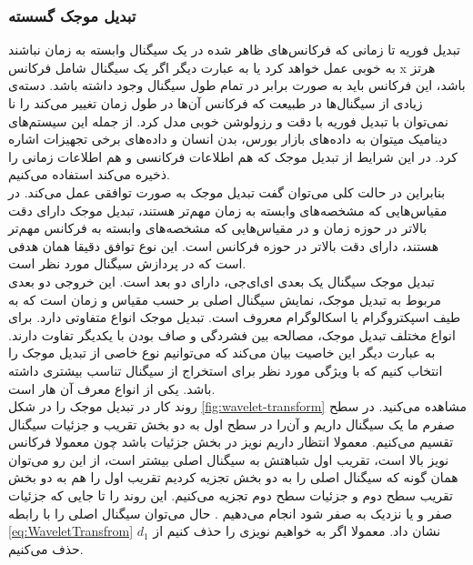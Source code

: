 \subsubsection{تبدیل موجک گسسته}
\label{sssection:DWT}
تبدیل فوریه تا زمانی که فرکانس‌های ظاهر شده در یک سیگنال وابسته به زمان نباشند به خوبی عمل خواهد کرد یا به عبارت دیگر اگر یک سیگنال شامل فرکانس x هرتز باشد، این فرکانس باید به صورت برابر در تمام طول سیگنال وجود داشته باشد.
دسته‌ی زیادی از سیگنال‌ها در طبیعت که فرکانس‌ ‌آن‌ها در طول زمان تغییر می‌کند را نا نمی‌توان با تبدیل فوریه با دقت و رزولوشن خوبی مدل کرد. از جمله این سیستم‌های دینامیک میتوان به داده‌های بازار بورس، بدن انسان و داده‌های برخی تجهیزات اشاره کرد. در این شرایط از تبدیل موجک که هم اطلاعات فرکانسی و هم اطلاعات زمانی را ذخیره می‌کند استفاده می‌کنیم.
\\
بنابراین در حالت کلی می‌توان گفت تبدیل موجک به صورت توافقی عمل می‌کند. در مقیاس‌هایی که مشخصه‌های وابسته به زمان مهم‌تر هستند، تبدیل موجک دارای دقت بالاتر در حوزه زمان و در مقیاس‌هایی که مشخصه‌های وابسته به فرکانس مهم‌تر هستند، دارای دقت بالاتر در حوزه فرکانس است. این نوع توافق دقیقا همان هدفی است که در پردازش سیگنال مورد نظر است.
\\
تبدیل موجک سیگنال یک بعدی ای‌ای‌جی، دارای دو بعد است. این خروجی دو بعدی مربوط به تبدیل موجک، نمایش سیگنال اصلی بر حسب مقیاس و زمان است که به طیف اسپکتروگرام 
 یا اسکالوگرام
معروف است. تبدیل موجک انواع متفاوتی دارد. برای انواع مختلف تبدیل موجک، مصالحه بین فشردگی 
 و صاف بودن 
  با یکدیگر تفاوت دارند. به عبارت دیگر این خاصیت بیان می‌کند که می‌توانیم نوع خاصی از تبدیل موجک را انتخاب کنیم که با ویژگی مورد نظر برای استخراج از سیگنال تناسب بیشتری داشته باشد. یکی از انواع معرف آن هار
  است.
  \\
روند کار در تبدیل موجک را در شکل 
  \ref{fig:wavelet-transform}
مشاهده می‌کنید.
در سطح صفرم ما یک سیگنال داریم و آن‌را در سطح اول به دو بخش تقریب
 و جزئیات
  سیگنال تقسیم می‌کنیم. معمولا انتظار داریم نویز در بخش جزئیات باشد چون معمولا فرکانس نویز بالا است، تقریب اول شباهتش به سیگنال اصلی بیشتر است، از این رو می‌توان همان گونه که سیگنال اصلی را به دو بخش تجزیه کردیم تقریب اول را هم به دو بخش تقریب سطح دوم و جزئیات سطح دوم تجزیه می‌کنیم. این روند را تا جایی که جزئیات صفر و یا نزدیک به صفر شود انجام می‌دهیم . حال می‌توان سیگنال اصلی را با رابطه
  \eqref{eq:WaveletTransfrom}
  نشان داد. معمولا اگر به خواهیم نویزی را حذف کنیم از $ d_1 $ حذف می‌کنیم.
  
